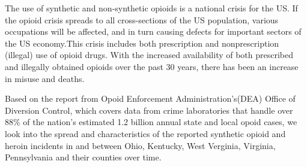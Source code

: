 The use of synthetic and non-synthetic opioids is a national crisis for the US. If the opioid crisis spreads to all cross-sections of the US population, various occupations will be affected, and in turn causing defects for important sectors of the US economy.This crisis includes both prescription and nonprescription (illegal) use of opioid drugs.\cite{1} With the increased availability of both prescribed and illegally obtained opioids over the past 30 years, there has been an increase in misuse and deaths.\cite{2}

Based on the report from Opoid Enforcement Administration's(DEA) Office of Diversion Control, which covers data from crime laboratories that handle over 88\% of the nation's estimated 1.2 billion annual state and local opoid cases, we look into the spread and characteristics of the reported synthetic opioid and heroin incidents in and between Ohio, Kentucky, West Verginia, Virginia, Pennsylvania and their counties over time.


